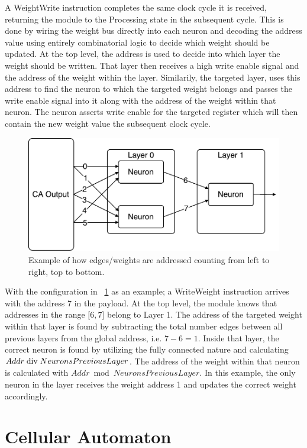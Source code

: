 A WeightWrite instruction completes the same clock cycle it is received,
returning the module to the Processing state in the subsequent cycle. This is
done by wiring the weight bus directly into each neuron and decoding the address
value using entirely combinatorial logic to decide which weight should be
updated. At the top level, the address is used to decide into which layer the
weight should be written. That layer then receives a high write enable signal
and the address of the weight within the layer. Similarily, the targeted layer,
uses this address to find the neuron to which the targeted weight belongs and
passes the write enable signal into it along with the address of the weight
within that neuron. The neuron asserts write enable for the targeted register
which will then contain the new weight value the subsequent clock cycle.

\begin{figure}[ht]
  \centering
  \includegraphics[width=0.6\linewidth]{fig/readout-addressing-scheme}
  \caption{Example of how edges/weights are addressed counting from left to right, top to bottom.}
  \label{fig:readout-addressing-scheme}
\end{figure}

With the configuration in \figurename~\ref{fig:readout-addressing-scheme} as an
example; a WriteWeight instruction arrives with the address 7 in the payload. At
the top level, the module knows that addresses in the range $\lbrack 6, 7 \rbrack$ belong to
Layer 1. The address of the targeted weight within that layer is found by
subtracting the total number edges between all previous layers from the global
address, i.e. $7 - 6 = 1$. Inside that layer, the correct neuron is found by
utilizing the fully connected nature and calculating $Addr \bdiv NeuronsPrevious
Layer$. The address of the weight within that neuron is calculated with $Addr
\bmod NeuronsPreviousLayer$. In this example, the only neuron in the layer
receives the weight address 1 and updates the correct weight accordingly.

\clearpage

\section{Cellular Automaton}
\label{sec:cellular-automaton}

